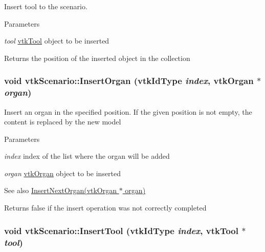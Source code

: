 Insert tool to the scenario. 
\begin{DoxyParams}{Parameters}
\item[{\em tool}]\hyperlink{classvtkTool}{vtkTool} object to be inserted \end{DoxyParams}
\begin{DoxyReturn}{Returns}
the position of the inserted object in the collection 
\end{DoxyReturn}
\hypertarget{classvtkScenario_a449c388c17ebaa975c69269e2b032530}{
\subsubsection[{InsertOrgan}]{\setlength{\rightskip}{0pt plus 5cm}void vtkScenario::InsertOrgan (vtkIdType {\em index}, \/  {\bf vtkOrgan} $\ast$ {\em organ})}}
\label{classvtkScenario_a449c388c17ebaa975c69269e2b032530}


Insert an organ in the specified position. If the given position is not empty, the content is replaced by the new model 
\begin{DoxyParams}{Parameters}
\item[{\em index}]index of the list where the organ will be added \item[{\em organ}]\hyperlink{classvtkOrgan}{vtkOrgan} object to be inserted \end{DoxyParams}
\begin{DoxySeeAlso}{See also}
\hyperlink{classvtkScenario_ab7aa43b4f165675fdfc437e142a466f3}{InsertNextOrgan(vtkOrgan $\ast$ organ)} 
\end{DoxySeeAlso}
\begin{DoxyReturn}{Returns}
false if the insert operation was not correctly completed 
\end{DoxyReturn}
\hypertarget{classvtkScenario_a4c250cc389a2da4caff6db86c12822e3}{
\subsubsection[{InsertTool}]{\setlength{\rightskip}{0pt plus 5cm}void vtkScenario::InsertTool (vtkIdType {\em index}, \/  {\bf vtkTool} $\ast$ {\em tool})}}
\label{classvtkScenario_a4c250cc389a2da4caff6db86c12822e3}


